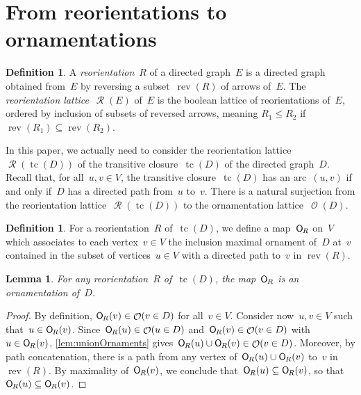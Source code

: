 \documentclass{amsart}
\newtheorem{lemma}[theorem]{Lemma}
\theoremstyle{definition}
\newtheorem{definition}[theorem]{Definition}
\renewcommand{\c}[1]{\mathcal{#1}} %
\DeclareMathOperator{\tc}{tc} %
\newcommand{\darkblue}{\color{darkblue}} %
\newcommand{\defn}[1]{\textsl{\darkblue #1}} %
\newcommand{\mymap}[2]{\mathsf{#1}_{\hspace{-.7pt}#2}}
\DeclareMathOperator{\Orn}{\c{O}}  %
\newcommand{\orn}[1]{\mymap{O}{#1}}  %
\DeclareMathOperator{\Reori}{\c{R}}  %
\DeclareMathOperator{\rev}{rev} %
\begin{document}

\section{From reorientations to ornamentations}
\label{sec:reorientations}

\begin{definition}
\label{def:Reori}
A \defn{reorientation}~$R$ of a directed graph~$E$ is a directed graph obtained from~$E$ by reversing a subset~$\rev(R)$ of arrows of~$E$.
The \defn{reorientation lattice}~$\Reori(E)$ of~$E$ is the boolean lattice of reorientations of~$E$, ordered by inclusion of subsets of reversed arrows, meaning $R_1 \le R_2$ if ${\rev(R_1) \subseteq \rev(R_2)}$.
\end{definition}

In this paper, we actually need to consider the reorientation lattice~$\Reori(\tc(D))$ of the transitive closure~$\tc(D)$ of the directed graph~$D$.
Recall that, for all~$u,v \in V$, the transitive closure~$\tc(D)$ has an arc~$(u,v)$ if and only if~$D$ has a directed path from~$u$ to~$v$.
There is a natural surjection from the reorientation lattice~$\Reori(\tc(D))$ to the ornamentation lattice~$\Orn(D)$.

\begin{definition}
\label{def:Reori2Orn}
For a reorientation~$R$ of~$\tc(D)$, we define a map~$\orn{R}$ on~$V$ which associates to each vertex~$v \in V$ the inclusion maximal ornament of~$D$ at~$v$ contained in the subset of vertices~$u \in V$ with a directed path to~$v$ in $\rev(R)$.
\end{definition}

\begin{lemma}
\label{lem:Reori2Orn1}
For any reorientation~$R$ of~$\tc(D)$, the map~$\orn{R}$ is an ornamentation of~$D$.
\end{lemma}

\begin{proof}
By definition, $\orn{R}(v) \in \Orn(v \in D)$ for all~$v \in V$.
Consider now~$u,v \in V$ such that~$u \in \orn{R}(v)$.
Since~$\orn{R}(u) \in \Orn(u \in D)$ and~$\orn{R}(v) \in \Orn(v \in D)$ with~${u \in \orn{R}(v)}$, \cref{lem:unionOrnaments} gives~$\orn{R}(u) \cup \orn{R}(v) \in \Orn(v \in D)$.
Moreover, by path concatenation, there is a path from any vertex of~$\orn{R}(u) \cup \orn{R}(v)$ to~$v$ in~$\rev(R)$.
By maximality of~$\orn{R}(v)$, we conclude that~$\orn{R}(u) \subseteq \orn{R}(v)$, so that~$\orn{R}(u) \subseteq \orn{R}(v)$.
\end{proof}
\end{document}
